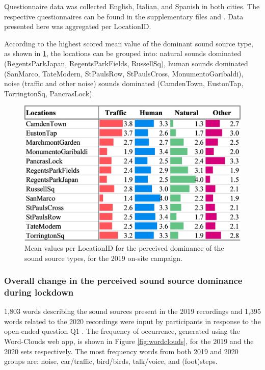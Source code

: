    Questionnaire data was collected English, Italian, and Spanish in both cities. The respective questionnaires can be found in the supplementary files and \citet{Mitchell2020Soundscape}. Data presented here was aggregated per LocationID.

   According to the highest scored mean value of the dominant sound source type, as shown in \cref{fig:sound-source-dom}, the locations can be grouped into: natural sounds dominated (RegentsParkJapan, RegentsParkFields, RussellSq), human sounds dominated (SanMarco, TateModern, StPaulsRow, StPaulsCross, MonumentoGaribaldi), noise (traffic and other noise) sounds dominated (CamdenTown, EustonTap, TorringtonSq, PancrasLock).

   \begin{figure}
     \centering
     \includegraphics[width=.8\textwidth]{Figures/Lockdown-Fig2.jpg}
     \caption{Mean values per LocationID for the perceived dominance of the sound source types, for the 2019 on-site campaign. \label{fig:sound-source-dom}}
   \end{figure}

   \subsubsection{Overall change in the perceived sound source dominance during lockdown}

   1,803 words describing the sound sources present in the 2019 recordings and 1,395 words related to the 2020 recordings were input by participants in response to the open-ended question Q1 . The frequency of occurrence, generated using the Word-Clouds web app, is shown in Figure \cref{fig:wordclouds}, for the 2019 and the 2020 sets respectively. The most frequency words from both 2019 and 2020 groups are: noise, car/traffic, bird/birds, talk/voice, and (foot)steps.

